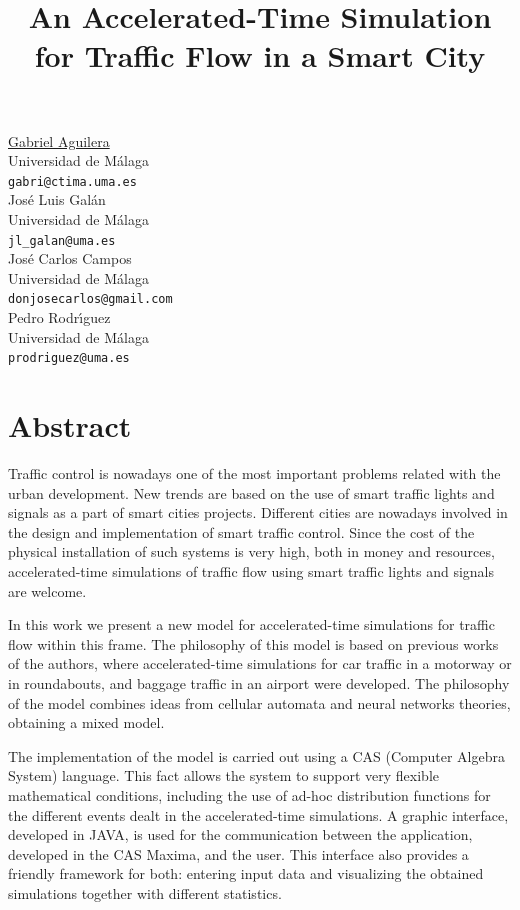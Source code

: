\documentclass[article, A4, 11pt]{llncs}%
\begin{document}
\title{An Accelerated-Time Simulation for Traffic Flow in a Smart City}
 \author{} \institute{}
\maketitle
\begin{center}
{\large \underline{Gabriel Aguilera}}\\
Universidad de M\'alaga\\
{\tt gabri@ctima.uma.es}
\\ \vspace{4mm}
{\large Jos\'e Luis Gal\'an}\\
Universidad de M\'alaga\\
{\tt jl\_galan@uma.es}
\\ \vspace{4mm}
{\large Jos\'e Carlos Campos}\\
Universidad de M\'alaga\\
{\tt donjosecarlos@gmail.com}
\\ \vspace{4mm}
{\large Pedro Rodr\'{\i}guez}\\
Universidad de M\'alaga\\
{\tt prodriguez@uma.es}
\end{center}

\section*{Abstract}
Traffic control is nowadays one of the most important problems related with the urban development. New trends are based on the use of smart traffic lights and signals as a part of smart cities projects. Different cities are nowadays involved in the design and implementation of smart traffic control. Since the cost of the physical installation of such systems is very high, both in money and resources, accelerated-time simulations of traffic flow using smart traffic lights and signals are welcome.

In this work we present a new model for accelerated-time simulations for traffic flow within this frame. The philosophy of this model is based on previous works of the authors, where accelerated-time simulations for car traffic in a motorway or in roundabouts, and baggage traffic in an airport were developed. The philosophy of the model combines ideas from cellular automata and neural networks theories, obtaining a mixed model.

The implementation of the model is carried out using a CAS (Computer Algebra System) language. This fact allows the system to support very flexible mathematical conditions, including the use of ad-hoc distribution functions for the different events dealt in the accelerated-time simulations. A graphic interface, developed in JAVA, is used for the communication between the application, developed in the CAS Maxima, and the user. This interface also provides a friendly framework for both: entering input data and visualizing the obtained simulations together with different statistics.
\end{document}
